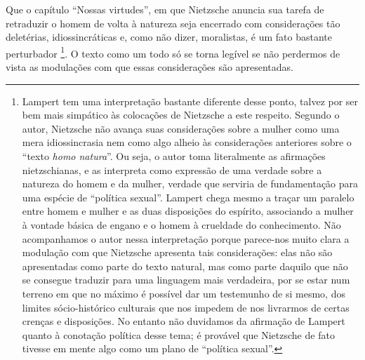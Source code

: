 \documentclass[
	12pt,				%
	openright,			%
	oneside,			%
	a4paper,			%
	english,			%
	french,				%
	spanish,			%
	brazil				%
	]{abntex2}
\begin{document}
Que o capítulo “Nossas virtudes”, em que Nietzsche anuncia sua tarefa de retraduzir o homem de volta à natureza seja encerrado com considerações tão deletérias, idiossincráticas e, como não dizer, moralistas, é um fato bastante perturbador
\footnote{Lampert tem uma interpretação bastante diferente desse ponto, talvez por ser bem mais simpático às colocações de Nietzsche a este respeito. Segundo o autor, Nietzsche não avança suas considerações sobre a mulher como uma mera idiossincrasia nem como algo alheio às considerações anteriores sobre o “texto \textit{homo natura}”. Ou seja, o autor toma literalmente as afirmações nietzschianas, e as interpreta como expressão de uma verdade sobre a natureza do homem e da mulher, verdade que serviria de fundamentação para uma espécie de “política sexual”.  Lampert chega mesmo a traçar um paralelo entre homem e mulher e as duas disposições do espírito, associando a mulher à vontade básica de engano e o homem à crueldade do conhecimento. Não acompanhamos o autor nessa interpretação porque parece-nos muito clara a modulação com que Nietzsche apresenta tais considerações: elas não são apresentadas como parte do texto natural, mas como parte daquilo que não se consegue traduzir para uma linguagem mais verdadeira, por se estar num terreno em que no máximo é possível dar um testemunho de si mesmo, dos limites sócio-histórico culturais que nos impedem de nos livrarmos de certas crenças e disposições. No entanto não duvidamos da afirmação de Lampert quanto à conotação política desse tema; é provável que Nietzsche de fato tivesse em mente algo como um plano de “política sexual”.}. 
O texto como um todo só se torna legível se não perdermos de vista as modulações com que essas considerações são apresentadas. 
	
\end{document}
